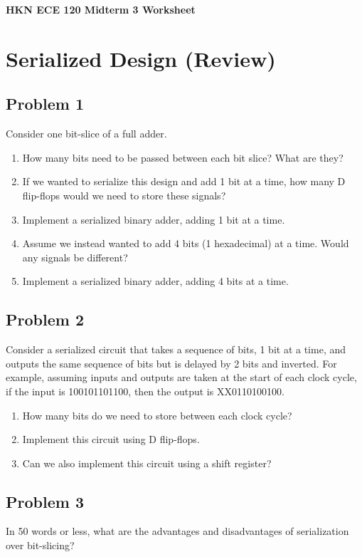 \documentclass{article}
\begin{document}
\begin{center}
\textbf{
{\Large HKN ECE 120 Midterm 3 Worksheet}
}
\end{center} 
\noindent\makebox[\linewidth]{\rule{\linewidth}{0.2pt}}


\section*{Serialized Design (Review)}
\subsection*{Problem 1}
Consider one bit-slice of a full adder.
\begin{enumerate}[label=\alph*.]
    \item How many bits need to be passed between each bit slice? What are they?
    \item If we wanted to serialize this design and add 1 bit at a time, how many D flip-flops would we need to store these signals?
    \item Implement a serialized binary adder, adding 1 bit at a time.
    \item Assume we instead wanted to add 4 bits (1 hexadecimal) at a time. Would any signals be different?
    \item Implement a serialized binary adder, adding 4 bits at a time.
\end{enumerate}


\subsection*{Problem 2}
Consider a serialized circuit that takes a sequence of bits, 1 bit at a time, and outputs the same sequence of bits but is delayed by 2 bits and inverted. For example, assuming inputs and outputs are taken at the start of each clock cycle, if the input is 100101101100, then the output is XX0110100100.
\begin{enumerate}[label=\alph*.]
    \item How many bits do we need to store between each clock cycle?
    \item Implement this circuit using D flip-flops.
    \item Can we also implement this circuit using a shift register?
\end{enumerate}


\subsection*{Problem 3}
In 50 words or less, what are the advantages and disadvantages of serialization over bit-slicing?
\end{document}
